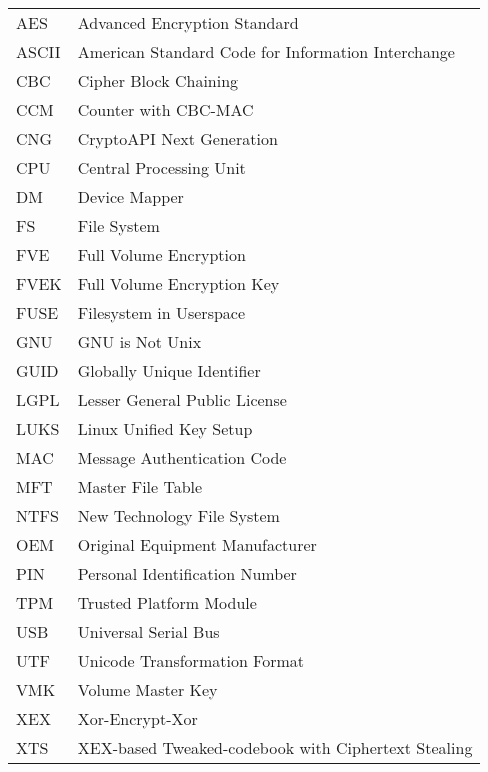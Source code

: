 
\seznamzkr

\begin{tabular}{ll}
  AES & Advanced Encryption Standard \\
  ASCII & American Standard Code for Information Interchange \\
  CBC & Cipher Block Chaining \\
  CCM & Counter with CBC-MAC \\
  CNG & CryptoAPI Next Generation \\
  CPU & Central Processing Unit \\
  DM & Device Mapper \\
  FS &  File System \\
  FVE & Full Volume Encryption \\
  FVEK & Full Volume Encryption Key \\
  FUSE & Filesystem in Userspace \\
  GNU & GNU is Not Unix \\
  GUID & Globally Unique Identifier \\
  LGPL & Lesser General Public License \\
  LUKS & Linux Unified Key Setup \\
  MAC & Message Authentication Code \\
  MFT & Master File Table \\
  NTFS & New Technology File System \\
  OEM & Original Equipment Manufacturer \\
  PIN & Personal Identification Number \\
  TPM & Trusted Platform Module \\
  USB & Universal Serial Bus \\
  UTF & Unicode Transformation Format \\
  VMK & Volume Master Key \\
  XEX & Xor-Encrypt-Xor \\
  XTS & XEX-based Tweaked-codebook with Ciphertext Stealing \\
\end{tabular}

